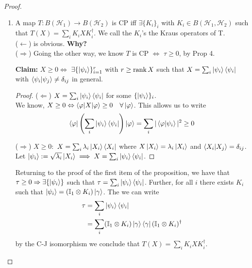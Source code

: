 \documentclass[../../note.tex]{subfiles}
\begin{document}
\begin{tcolorbox}[colframe=black,breakable, colback=black!5, arc=0pt, outer arc=0pt,boxrule=0.5pt]
\begin{proof}
\begin{enumerate}
    \item A map $T:B(\mathcal{H}_1)\rightarrow B(\mathcal{H}_2)$ is CP iff $\exists \{K_i\}_i$ with $K_i \in B(\mathcal{H}_1,\mathcal{H}_2)$ such that $T(X) = \sum_i K_i X K_i^{\dagger}$. We call the $K_i$'s the Kraus operators of T.\\
    
    ($\leftarrow$) is obvious. \textbf{Why?}\\
    
    ($\Rightarrow$) Going the other way, we know $T$ is CP $\Leftrightarrow$ $\tau \geq 0$, by Prop 4. 
    
    \textbf{Claim:} $X\geq 0 \Leftrightarrow$ $\exists \{\ket{\psi_i}\}_{i=1}^r$ with $r \geq \operatorname{rank} X$ such that $X=\sum_i \ket{\psi_i}\bra{\psi_i}$ with $\braket{\psi_i | \psi_j} \neq \delta_{ij}$ in general. 
    \begin{proof}
    ($\Leftarrow$) $X = \sum_i \ket{\psi_i}\bra{\psi_i}$ for some $\{\ket{\psi_i}\}_i$. \\
    
    We know, $X \geq 0 \Leftrightarrow \braket{\varphi|X|\varphi} \geq 0 \quad \forall \ket{\varphi}$. This allows us to write
    \begin{align}
        \bra{\varphi}\left(\sum_i \ket{\psi_i}\bra{\psi_i}\right)\ket{\varphi} = \sum_i |\braket{\varphi|\psi_i}|^2 \geq 0
    \end{align}
    
    ($\Rightarrow$) $X \geq 0: $ $X=\sum_i \lambda_i \ket{X_i}\bra{X_i}$ where $X\ket{X_i} = \lambda_i \ket{X_i}$ and $\braket{X_i | X_j} = \delta_{ij}$. Let $\ket{\psi_i}:= \sqrt{\lambda_i}\ket{X_i} \implies X=\sum_i \ket{\psi_i}\bra{\psi_i}$.
    \end{proof}
    Returning to the proof of the first item of the proposition, we have that $\tau \geq 0 \Rightarrow \exists \{\ket{\psi_i}\}$ such that $\tau = \sum_i \ket{\psi_i}\bra{\psi_i}$. Further, for all $i$ there exists $K_i$ such that $\ket{\psi_i} =(\mathbb{I}_1 \otimes K_i)\ket{\gamma}$. The we can write
    \begin{align}
        \tau &= \sum_i \ket{\psi_i}\bra{\psi_i} \\
        &= \sum_i (\mathbb{I}_1 \otimes K_i) \ket{\gamma} \bra{\gamma} (\mathbb{I}_1 \otimes K_i)^{\dagger}
    \end{align}
    by the C-J isomorphism we conclude that $T(X) = \sum_i K_i X K_i^{\dagger}$.
    

\end{enumerate}
\end{proof}
\end{tcolorbox}
\end{document}
